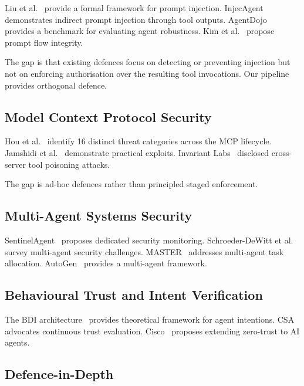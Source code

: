 \documentclass[10pt,a4paper,twocolumn]{article}
\begin{document}
Liu et al.~\cite{liu2024formalizing} provide a formal framework for prompt injection. InjecAgent~\cite{zhan2024injecagent} demonstrates indirect prompt injection through tool outputs. AgentDojo~\cite{debenedetti2024agentdojo} provides a benchmark for evaluating agent robustness. Kim et al.~\cite{kim2025promptflow} propose prompt flow integrity.

The gap is that existing defences focus on detecting or preventing injection but not on enforcing authorisation over the resulting tool invocations. Our pipeline provides orthogonal defence.

\subsection{Model Context Protocol Security}
\label{sec:mcp_security}

Hou et al.~\cite{gupta2025security} identify 16 distinct threat categories across the MCP lifecycle. Jamshidi et al.~\cite{jamshidi2025securing} demonstrate practical exploits. Invariant Labs~\cite{invariantlabs2025toolpoisoning} disclosed cross-server tool poisoning attacks.

The gap is ad-hoc defences rather than principled staged enforcement.

\subsection{Multi-Agent Systems Security}
\label{sec:multi_agent}

SentinelAgent~\cite{patil2026sentinelagent} proposes dedicated security monitoring. Schroeder-DeWitt et al.~\cite{schroederdewitt2025open} survey multi-agent security challenges. MASTER~\cite{xu2025master} addresses multi-agent task allocation. AutoGen~\cite{wu2023autogen} provides a multi-agent framework.

\subsection{Behavioural Trust and Intent Verification}
\label{sec:trust}

The BDI architecture~\cite{rao1995bdi} provides theoretical framework for agent intentions. CSA~\cite{csa2025fortifying} advocates continuous trust evaluation. Cisco~\cite{cisco2025redefining} proposes extending zero-trust to AI agents.

\subsection{Defence-in-Depth}
\label{sec:depth}
\end{document}

